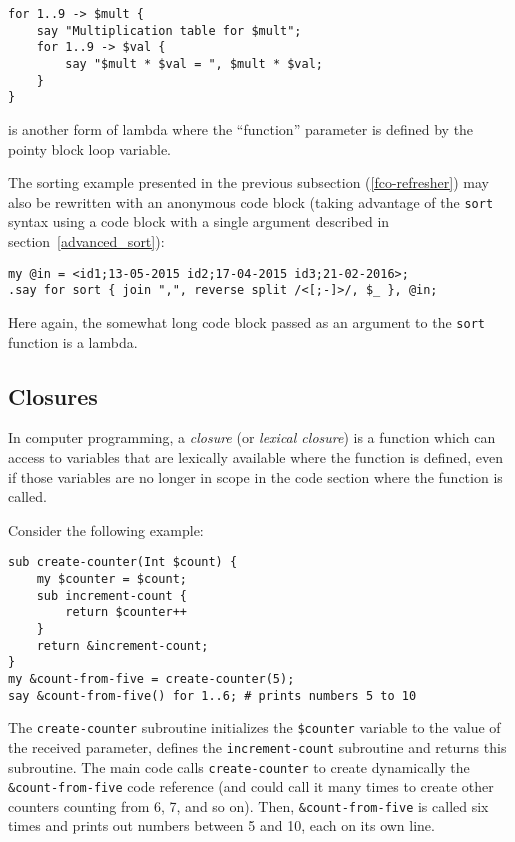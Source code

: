 \begin{verbatim}
for 1..9 -> $mult {
    say "Multiplication table for $mult";
    for 1..9 -> $val {
        say "$mult * $val = ", $mult * $val;
    }
}
\end{verbatim}

is another form of lambda where the ``function'' parameter is 
defined by the pointy block loop variable.

The sorting example presented in the previous subsection 
(\ref{fco-refresher}) may also be rewritten with an 
anonymous code block (taking advantage of the {\tt sort} 
syntax using a code block with a single argument described 
in section~\ref{advanced_sort}):
\begin{verbatim}
my @in = <id1;13-05-2015 id2;17-04-2015 id3;21-02-2016>;
.say for sort { join ",", reverse split /<[;-]>/, $_ }, @in;
\end{verbatim}

Here again, the somewhat long code block passed as an 
argument to the {\tt sort} function is a lambda.

\subsection{Closures}

In computer programming, a \emph{closure} (or \emph{lexical 
closure}) is a function which can access to variables that 
are lexically available where the function is defined, even 
if those variables are no longer in scope in the code section 
where the function is called.

Consider the following example:

\begin{verbatim}
sub create-counter(Int $count) {
    my $counter = $count;
    sub increment-count {
        return $counter++
    }
    return &increment-count;
}
my &count-from-five = create-counter(5);
say &count-from-five() for 1..6; # prints numbers 5 to 10
\end{verbatim}

The {\tt create-counter} subroutine initializes the 
\verb'$counter' variable to the value of the received 
parameter, defines the {\tt increment-count} subroutine 
and returns this subroutine. The main code calls 
{\tt create-counter} to create dynamically the 
\verb'&count-from-five' code reference (and could 
call it many times to create other counters counting 
from 6, 7, and so on).  Then, \verb'&count-from-five' 
is called six times and prints out numbers between 5 
and 10, each on its own line.

